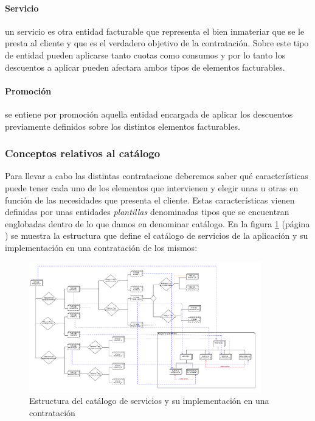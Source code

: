 \paragraph{Servicio} un servicio es otra entidad facturable que representa el bien inmateriar que se le presta al cliente y que es el verdadero objetivo de la contratación. Sobre este tipo de entidad pueden aplicarse tanto cuotas como consumos  y por lo tanto los descuentos a aplicar pueden afectara ambos tipos de elementos facturables.

\paragraph{Promoción} se entiene por promoción aquella entidad encargada de aplicar los descuentos previamente definidos sobre los distintos elementos facturables. \newline



\subsubsection{Conceptos relativos al catálogo}
\label{sub:catálogo-conceptos}


Para llevar a cabo las distintas contratacione deberemos saber qué características puede tener cada uno de los elementos que intervienen y elegir unas u otras en función de las necesidades que presenta el cliente. Estas características vienen definidas por unas entidades \textit{plantillas} denominadas tipos que se encuentran englobadas dentro de lo que damos en denominar catálogo. En la figura \ref{fig:estructura-catalogo} (página \pageref{fig:estructura-catalogo}) se muestra la estructura que define el catálogo de servicios de la aplicación y su implementación en una contratación de los mismos:

\begin{figure}[H]
  \centering
  \includegraphics[width=0.90\textwidth]{imaxes/estructura-catalogo.png}
  \caption{Estructura del catálogo de servicios y su implementación en una contratación}
  \label{fig:estructura-catalogo}
\end{figure}


